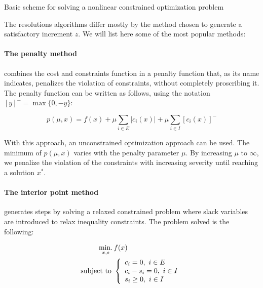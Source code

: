 \begin{algorithm}
\begin{algorithmic}
  \Repeat
\caption{Basic scheme for solving a nonlinear constrained optimization problem}
\label{alg:basic_optim_nlcp}
\end{algorithmic}
\end{algorithm}

The resolutions algorithms differ mostly by the method chosen to generate a satisfactory increment $z$. We will list here some of the most popular methods:

\paragraph{The penalty method} combines the cost and constraints function in a penalty function that, as its name indicates, penalizes the violation of constraints, without completely proscribing it.
The penalty function can be written as follows, using the notation ${[y]}^- = \max\{0, -y\}$:

\begin{equation}
  \label{penalty_function}
  p(\mu, x) = f(x) + \mu \sum_{i\in E}|c_i(x)| + \mu \sum_{i\in I} {[c_i(x)]}^-
\end{equation}

With this approach, an unconstrained optimization approach can be used.
The minimum of $p(\mu,x)$ varies with the penalty parameter $\mu$.
By increasing $\mu$ to $\infty$, we penalize the violation of the constraints with increasing severity until reaching a solution $x^*$.

\paragraph{The interior point method} generates steps by solving a relaxed constrained problem where slack variables are introduced to relax inequality constraints.
The problem solved is the following:

\begin{equation}
\label{eq:interior_point}
\begin{aligned}
  \operatorname*{min.}_{x,s}{} & f(x)\\
  \text{subject to }&
  \left\{
    \begin{array}{l}
     c_i = 0,\ i\in E\\
     c_i - s_i = 0,\ i\in I\\
     s_i \geq 0,\ i\in I
  \end{array}
  \right.
\end{aligned}
\end{equation}

